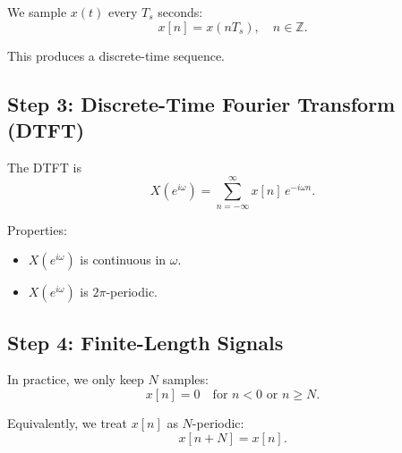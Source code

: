\documentclass[a4paper,12pt]{article}
\begin{document}
We sample $x(t)$ every $T_s$ seconds:
\[
x[n] = x(nT_s), \quad n \in \mathbb{Z}.
\]

This produces a discrete-time sequence.

\subsection{Step 3: Discrete-Time Fourier Transform (DTFT)}

The DTFT is
\[
X(e^{i\omega}) = \sum_{n=-\infty}^{\infty} x[n]\, e^{-i \omega n}.
\]

Properties:
\begin{itemize}
    \item $X(e^{i\omega})$ is continuous in $\omega$.
    \item $X(e^{i\omega})$ is $2\pi$-periodic.
\end{itemize}

\subsection{Step 4: Finite-Length Signals}

In practice, we only keep $N$ samples:
\[
x[n] = 0 \quad \text{for } n < 0 \text{ or } n \geq N.
\]

Equivalently, we treat $x[n]$ as $N$-periodic:
\[
x[n+N] = x[n].
\]
\end{document}
